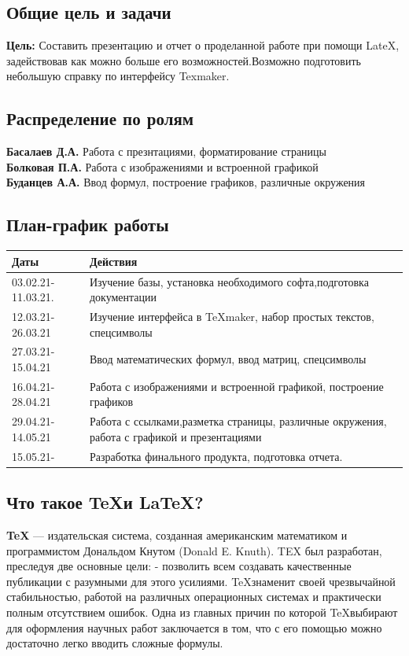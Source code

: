 \documentclass[a4paper,12pt]{report}
\begin{document}
\subsection{Общие цель и задачи}
\textbf{Цель:} Составить презентацию и отчет о проделанной работе при помощи LateX, задействовав как можно больше его возможностей.Возможно подготовить небольшую справку по интерфейсу Texmaker.
\subsection{Распределение по ролям}
\textbf{Басалаев Д.А.} Работа с презнтациями, форматирование страницы\\
\textbf{Болковая П.А.} Работа с изображениями и встроенной графикой\\
\textbf{Буданцев А.А.} Ввод формул, построение графиков, различные окружения
\subsection{План-график работы}
\begin{tabular}{| l| p{13cm}|}
\hline {\bfseries \large Даты} & {\bfseries \large Действия}\\ \hline
03.02.21-11.03.21. & Изучение базы, установка необходимого софта,подготовка документации\\ \hline
12.03.21-26.03.21 & Изучение интерфейса в \TeX maker, набор простых текстов, спецсимволы \\ \hline
27.03.21-15.04.21 & Ввод математических формул, ввод матриц, спецсимволы  \\ \hline
16.04.21-28.04.21 & Работа с изображениями и встроенной графикой, построение графиков \\ \hline 
29.04.21-14.05.21 & Работа с ссылками,разметка страницы, различные окружения, работа с графикой и презентациями \\ \hline
15.05.21- & Разработка финального продукта, подготовка отчета. \\ \hline
\end{tabular}
\subsection{Что такое \TeX и \LaTeX ?}
\textbf{\TeX} — издательская система, созданная американским математиком и программистом Дональдом Кнутом (Donald E. Knuth). TEX был разработан, преследуя две основные цели: - позволить всем создавать качественные публикации с разумными для этого усилиями. \TeX знаменит своей чрезвычайной стабильностью, работой на различных операционных системах и практически полным отсутствием ошибок. Одна из главных причин по которой \TeX выбирают для оформления научных работ заключается в том, что с его помощью можно достаточно легко вводить сложные формулы.\\
\end{document}
